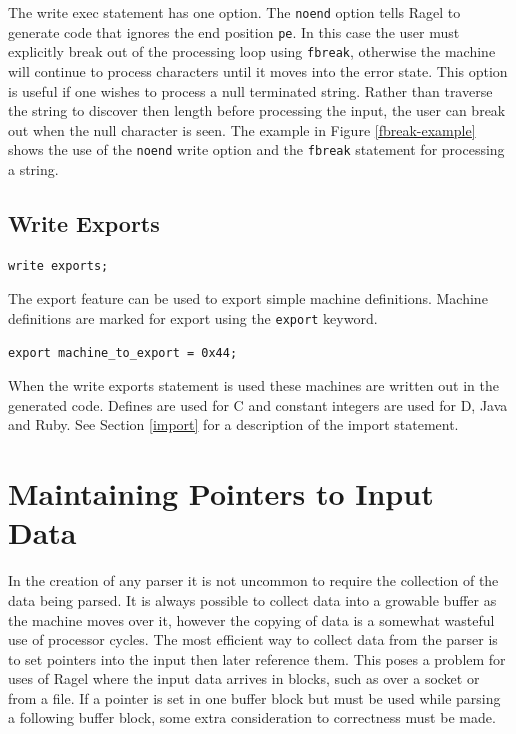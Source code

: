 \documentclass[letterpaper,11pt,oneside]{book}
\newcommand{\verbspace}{\vspace{10pt}}
\begin{document}
The write exec statement has one option. The \verb|noend| option tells Ragel
to generate code that ignores the end position \verb|pe|. In this
case the user must explicitly break out of the processing loop using
\verb|fbreak|, otherwise the machine will continue to process characters until
it moves into the error state. This option is useful if one wishes to process a
null terminated string. Rather than traverse the string to discover then length
before processing the input, the user can break out when the null character is
seen.  The example in Figure \ref{fbreak-example} shows the use of the
\verb|noend| write option and the \verb|fbreak| statement for processing a string.

\subsection{Write Exports}
\label{export}

\begin{verbatim}
write exports;
\end{verbatim}
\verbspace

The export feature can be used to export simple machine definitions. Machine definitions
are marked for export using the \verb|export| keyword.

\verbspace
\begin{verbatim}
export machine_to_export = 0x44;
\end{verbatim}
\verbspace

When the write exports statement is used these machines are 
written out in the generated code. Defines are used for C and constant integers
are used for D, Java and Ruby. See Section \ref{import} for a description of the
import statement.

\section{Maintaining Pointers to Input Data}

In the creation of any parser it is not uncommon to require the collection of
the data being parsed.  It is always possible to collect data into a growable
buffer as the machine moves over it, however the copying of data is a somewhat
wasteful use of processor cycles. The most efficient way to collect data from
the parser is to set pointers into the input then later reference them.  This
poses a problem for uses of Ragel where the input data arrives in blocks, such
as over a socket or from a file. If a pointer is set in one buffer block but
must be used while parsing a following buffer block, some extra consideration
to correctness must be made.
\end{document}
